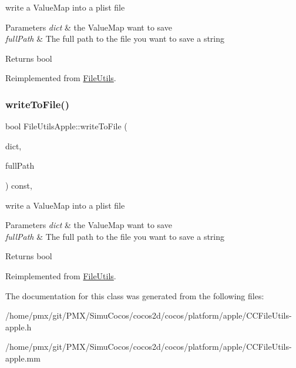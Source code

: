 write a Value\+Map into a plist file


\begin{DoxyParams}{Parameters}
{\em dict} & the Value\+Map want to save \\
\hline
{\em full\+Path} & The full path to the file you want to save a string \\
\hline
\end{DoxyParams}
\begin{DoxyReturn}{Returns}
bool 
\end{DoxyReturn}


Reimplemented from \hyperlink{classFileUtils_a503e4cf24b5bd8b13780370fa8e2c8f4}{File\+Utils}.

\mbox{\label{classFileUtilsApple_a2c762108569f84b4db36ae6d6cb3760f}} 
\subsubsection{\texorpdfstring{write\+To\+File()}{writeToFile()}\hspace{0.1cm}{\footnotesize\ttfamily [2/2]}}
{\footnotesize\ttfamily bool File\+Utils\+Apple\+::write\+To\+File (\begin{DoxyParamCaption}\item[{const Value\+Map \&}]{dict,  }\item[{const std\+::string \&}]{full\+Path }\end{DoxyParamCaption}) const\hspace{0.3cm}{\ttfamily [override]}, {\ttfamily [virtual]}}

write a Value\+Map into a plist file


\begin{DoxyParams}{Parameters}
{\em dict} & the Value\+Map want to save \\
\hline
{\em full\+Path} & The full path to the file you want to save a string \\
\hline
\end{DoxyParams}
\begin{DoxyReturn}{Returns}
bool 
\end{DoxyReturn}


Reimplemented from \hyperlink{classFileUtils_aaf55e6d080352b5fec3924521ab553e2}{File\+Utils}.



The documentation for this class was generated from the following files\+:\begin{DoxyCompactItemize}
\item 
/home/pmx/git/\+P\+M\+X/\+Simu\+Cocos/cocos2d/cocos/platform/apple/C\+C\+File\+Utils-\/apple.\+h\item 
/home/pmx/git/\+P\+M\+X/\+Simu\+Cocos/cocos2d/cocos/platform/apple/C\+C\+File\+Utils-\/apple.\+mm\end{DoxyCompactItemize}
